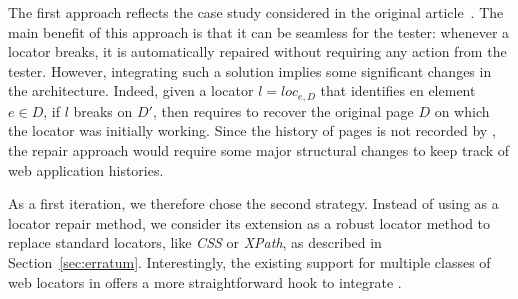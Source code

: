 \documentclass[10pt,conference]{IEEEtran}
\begin{document}
The first approach reflects the case study considered in the original \erratum article~\cite{brisset2021erratum}.
The main benefit of this approach is that it can be seamless for the tester: whenever a locator breaks, it is automatically repaired without requiring any action from the tester.
However, integrating such a solution implies some significant changes in the \cerberus architecture.
Indeed, given a locator $l = loc_{e,D}$ that identifies en element $e \in D$, if $l$ breaks on $D'$, then \erratum requires to recover the original page $D$ on which the locator was initially working.
Since the history of pages is not recorded by \cerberus, the repair approach would require some major structural changes to keep track of web application histories.

As a first iteration, we therefore chose the second strategy.
Instead of using \erratum as a locator repair method, we consider its extension as a robust locator method to replace standard locators, like \textit{CSS} or \textit{XPath}, as described in Section~\ref{sec:erratum}.
Interestingly, the existing support for multiple classes of web locators in \cerberus offers a more straightforward hook to integrate \erratum.
\end{document}
